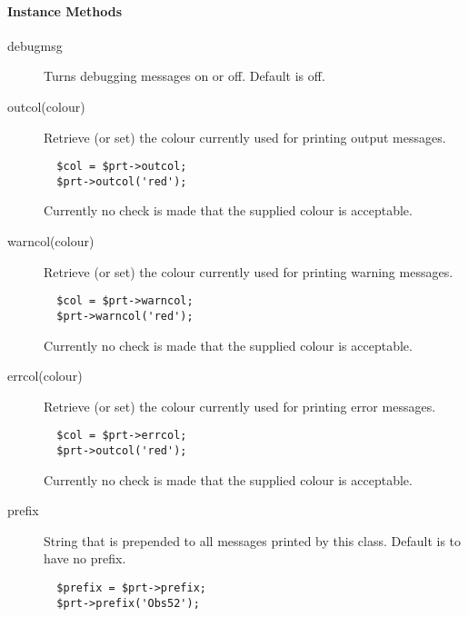 \paragraph*{Instance Methods\label{ORAC::Print_Instance_Methods}}
\begin{description}

\item[debugmsg] \mbox{}

Turns debugging messages on or off. Default is off.


\item[outcol(colour)] \mbox{}

Retrieve (or set) the colour currently used for printing output
messages.

\begin{verbatim}
  $col = $prt->outcol;
  $prt->outcol('red');
\end{verbatim}


Currently no check is made that the supplied colour is acceptable.


\item[warncol(colour)] \mbox{}

Retrieve (or set) the colour currently used for printing warning
messages.

\begin{verbatim}
  $col = $prt->warncol;
  $prt->warncol('red');
\end{verbatim}


Currently no check is made that the supplied colour is acceptable.


\item[errcol(colour)] \mbox{}

Retrieve (or set) the colour currently used for printing error
messages.

\begin{verbatim}
  $col = $prt->errcol;
  $prt->outcol('red');
\end{verbatim}


Currently no check is made that the supplied colour is acceptable.


\item[prefix] \mbox{}

String that is prepended to all messages printed by this class.
Default is to have no prefix.

\begin{verbatim}
  $prefix = $prt->prefix;
  $prt->prefix('Obs52');
\end{verbatim}


\end{description}
